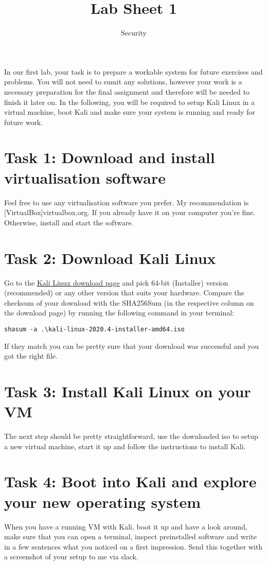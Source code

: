 \documentclass{article}
\title{Lab Sheet 1}
\date{Security}
\begin{document}
\maketitle
In our first lab, your task is to prepare a workable system for future exercises and problems. You will not need to sumit any solutions, however your work is a necessary preparation for the final assignment and therefore will be needed to finish it later on. In the following, you will be required to setup Kali Linux in a virtual machine, boot Kali and make sure your system is running and ready for future work.

\section{Task 1: Download and install virtualisation software}
Feel free to use any virtualisation software you prefer. My recommendation is [VirtualBox]{virtualbox.org}. If you already have it on your computer you're fine. Otherwise, install and start the software.

\section{Task 2: Download Kali Linux}
Go to the \href{https://www.kali.org/downloads/}{Kali Linux download page} and pick 64-bit (Installer) version (recommended) or any other version that suits your hardware. Compare the checksum of your download with the SHA256Sum (in the respective column on the download page) by running the following command in your terminal:

\begin{lstlisting}
shasum -a .\kali-linux-2020.4-installer-amd64.iso
\end{lstlisting}

If they match you can be pretty sure that your download was successful and you got the right file.

\section{Task 3: Install Kali Linux on your VM}
The next step should be pretty straightforward, use the downloaded iso to setup a new virtual machine, start it up and follow the instructions to install Kali.

\section{Task 4: Boot into Kali and explore your new operating system}
When you have a running VM with Kali, boot it up and have a look around, make sure that you can open a terminal, inspect preinstalled software and write in a few sentences what you noticed on a first impression. Send this together with a screenshot of your setup to me via slack.
\end{document}
